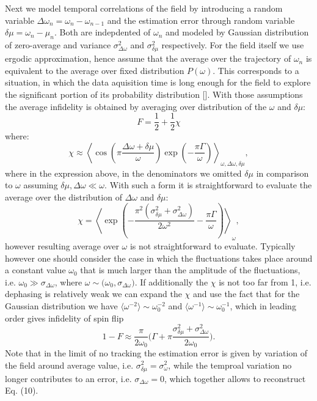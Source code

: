 \documentclass[aps,twocolumn,pra,notitlepage,]{revtex4-2}
\begin{document}
Next we model temporal correlations of the field by introducing a random variable $\Delta\omega_n = \omega_n - \omega_{n-1}$ and the estimation error through random variable $\delta \mu=\omega_n -\mu_n$. Both are indepdented of $\omega_n$ and modeled by Gaussian distribution of zero-average and variance $\sigma_{\Delta\omega}^2$ and $\sigma_{\delta\mu}^2$ respectively. For the field itself we use ergodic approximation, hence assume that the average over the trajectory of $\omega_n$ is equivalent to the average over fixed distribution $P(\omega)$. This corresponds to a situation, in which the data aquisition time is long enough for the field to explore the significant portion of its probability distribution []. With those assumptions the average infidelity is obtained by averaging over distribution of the $\omega$ and $\delta \mu$: 
\begin{equation}
    F  = \frac{1}{2} + \frac{1}{2} \chi
\end{equation}
where:
\begin{equation}
\chi \approx \left\langle \cos\left(\pi\frac{ \Delta \omega + \delta \mu}{\omega}\right)\exp(-\frac{\pi\Gamma}{\omega})  \right\rangle_{\omega, \Delta \omega, \delta \mu},
\end{equation}
where in the expression above, in the denominators we omitted $\delta \mu$ in comparison to $\omega$ assuming $\delta \mu, \Delta \omega \ll \omega$. With such a form it is straightforward to evaluate the average over the distribution of $\Delta \omega$ and $\delta \mu$:
\begin{equation}
    \chi = \left\langle \exp\left(-\frac{\pi^2(\sigma^2_{\delta \mu} + \sigma^2_{\Delta\omega})}{2\omega^2} - \frac{\pi\Gamma}{\omega} \right) \right\rangle_{\omega},
\end{equation}
however resulting average over $\omega$ is not straightforward to evaluate. Typically however one should consider the case in which the fluctuations takes place around a constant value $\omega_0$ that is much larger than the amplitude of the fluctuations, i.e. $\omega_0 \gg \sigma_{\Delta\omega}$, where $\omega \sim \mathcal(\omega_0, \sigma_{\Delta\omega})$. If additionally the $\chi$ is not too far from 1, i.e. dephasing is relatively weak we can expand the $\chi$ and use the fact that for the Gaussian distribution we have $\langle \omega^{-2} \rangle \sim \omega_0^{-2}$ and $\langle \omega^{-1} \rangle \sim \omega_0^{-1}$, which in leading order gives infidelity of spin flip
\begin{equation}
     1 - F \approx  \frac{\pi}{2\omega_0} \bigg(\Gamma + \pi\frac{\sigma^2_{\delta \mu} + \sigma^2_{\Delta\omega}}{2\omega_0}\bigg).
\end{equation}
Note that in the limit of no tracking  the estimation error is given by variation of the field around average value, i.e. $\sigma_{\delta \mu}^2 =  \sigma_{\omega}^2$, while the temproal variation no longer contributes to an error, i.e. $\sigma_{\Delta\omega} = 0$, which together allows to reconstruct Eq. (10).
\end{document}
